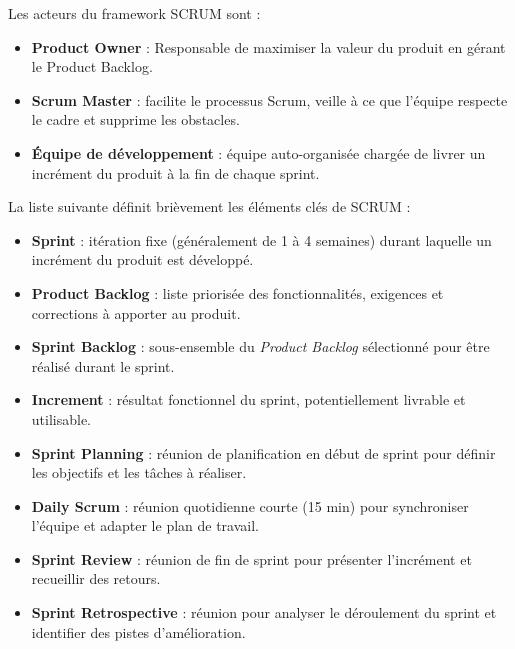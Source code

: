 \documentclass[12pt,a4paper]{report}
\begin{document}
	Les acteurs du framework SCRUM sont :
	
	\begin{itemize}
		
		\item \textbf{Product Owner} : Responsable de maximiser la valeur du produit en gérant le Product Backlog.
		
		\item \textbf{Scrum Master} : facilite le processus Scrum, veille à ce que l’équipe respecte le cadre et supprime les obstacles.
		
		\item \textbf{Équipe de développement} : équipe auto-organisée chargée de livrer un incrément du produit à la fin de chaque sprint.
		
	\end{itemize}
	
	La liste suivante définit brièvement les éléments clés de SCRUM :
	
	\begin{itemize}
		
		\item \textbf{Sprint} : itération fixe (généralement de 1 à 4 semaines) durant laquelle un incrément du produit est développé.
		
		\item \textbf{Product Backlog} : liste priorisée des fonctionnalités, exigences et corrections à apporter au produit.
		
		\item \textbf{Sprint Backlog} : sous-ensemble du \textit{Product Backlog} sélectionné pour être réalisé durant le sprint.
		
		\item \textbf{Increment} : résultat fonctionnel du sprint, potentiellement livrable et utilisable.
		
		\item \textbf{Sprint Planning} : réunion de planification en début de sprint pour définir les objectifs et les tâches à réaliser.
		
		\item \textbf{Daily Scrum} : réunion quotidienne courte (15 min) pour synchroniser l’équipe et adapter le plan de travail.
		
		\item \textbf{Sprint Review} : réunion de fin de sprint pour présenter l’incrément et recueillir des retours.
		
		\item \textbf{Sprint Retrospective} : réunion pour analyser le déroulement du sprint et identifier des pistes d’amélioration.
	\end{itemize}
	
\end{document}
